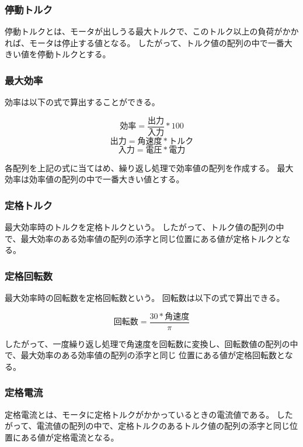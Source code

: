 \subsubsection{停動トルク}\label{sub:sub:teidoutoruku}
停動トルクとは、モータが出しうる最大トルクで、このトルク以上の負荷がかかれば、モータは停止する値となる。
したがって、トルク値の配列の中で一番大きい値を停動トルクとする。

\subsubsection{最大効率}\label{sub:sub:saidaikouritu}
効率は以下の式で算出することができる。

\[
    \mbox{効率} = \frac{\mbox{出力}}{\mbox{入力}}  * 100 
\]
\[
    \mbox{出力} = \mbox{角速度} * \mbox{トルク} 
\]
\[  
    \mbox{入力} = \mbox{電圧} * \mbox{電力} 
\]

各配列を上記の式に当てはめ、繰り返し処理で効率値の配列を作成する。
最大効率は効率値の配列の中で一番大きい値とする。


\subsubsection{定格トルク}\label{sub:sub:teikakutoruku}
最大効率時のトルクを定格トルクという。
したがって、トルク値の配列の中で、最大効率のある効率値の配列の添字と同じ位置にある値が定格トルクとなる。



\subsubsection{定格回転数}\label{sub:sub:teikakukaiten}
最大効率時の回転数を定格回転数という。
回転数は以下の式で算出できる。

\[
    \mbox{回転数} = \frac{30 * \mbox{角速度}}{\pi}   
\]

したがって、一度繰り返し処理で角速度を回転数に変換し、回転数値の配列の中で、最大効率のある効率値の配列の添字と同じ
位置にある値が定格回転数となる。


\subsubsection{定格電流}\label{sub:sub:teikakuden}
定格電流とは、モータに定格トルクがかかっているときの電流値である。
したがって、電流値の配列の中で、定格トルクのあるトルク値の配列の添字と同じ位置にある値が定格電流となる。

